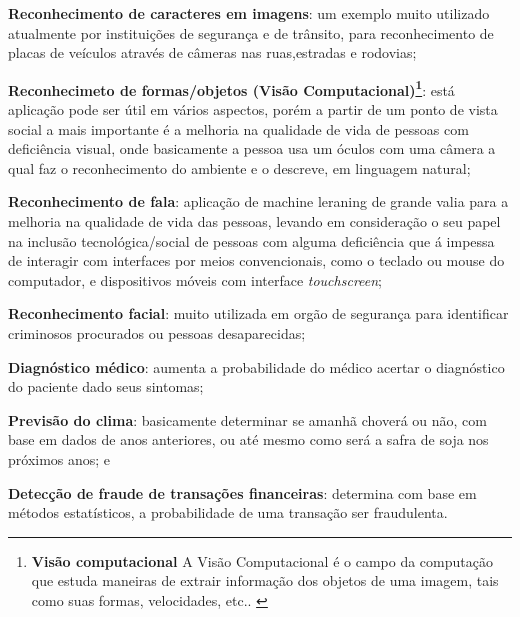  \begin{alineas}
	\item \textbf{Reconhecimento de caracteres em imagens}: um exemplo muito utilizado atualmente por instituições de segurança e de trânsito, para 
	reconhecimento de placas de veículos através de câmeras nas ruas,estradas e rodovias;  
	\item \textbf{Reconhecimeto de formas/objetos (Visão Computacional)\footnote{\textbf{Visão computacional} A Visão Computacional é o campo da computação que estuda
maneiras de extrair informação dos objetos de uma imagem, tais como suas
formas, velocidades, etc.. \cite{vscomp}}}: está aplicação pode ser útil em vários aspectos, porém a partir de um ponto de vista social a mais importante 
	é a melhoria na qualidade de vida de pessoas com deficiência visual, onde basicamente a pessoa usa um óculos com uma câmera a qual faz o reconhecimento do ambiente
	e o descreve, em linguagem natural;  
	\item \textbf{Reconhecimento de fala}: aplicação de machine leraning de grande valia para a melhoria na qualidade de vida das pessoas,
	levando em consideração o seu papel na inclusão tecnológica/social de pessoas com alguma deficiência que á impessa de interagir 
	com interfaces por meios convencionais, como o teclado ou  mouse do computador, e dispositivos móveis com interface \textit{touchscreen};
	\item \textbf{Reconhecimento facial}: muito utilizada em orgão de segurança para identificar criminosos procurados ou pessoas desaparecidas;
	\item \textbf{Diagnóstico médico}: aumenta a probabilidade do médico acertar o diagnóstico do paciente dado seus sintomas;   
	\item \textbf{Previsão do clima}: basicamente determinar se amanhã choverá ou não, com base em dados de anos anteriores, ou até mesmo como será a 
	safra de soja nos próximos anos; e 
	\item \textbf{Detecção de fraude de transações financeiras}: determina com base em métodos estatísticos, a probabilidade de uma transação ser fraudulenta.
 \end{alineas}

